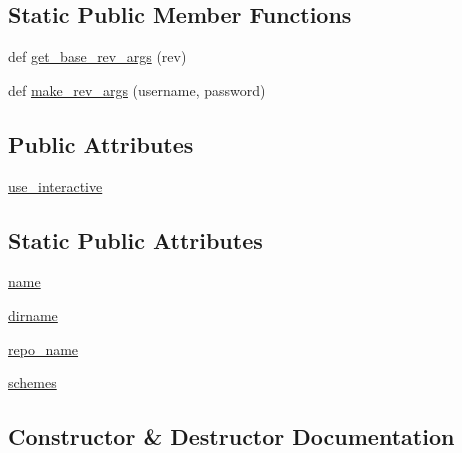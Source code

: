 \subsection*{Static Public Member Functions}
\begin{DoxyCompactItemize}
\item 
def \hyperlink{classpip_1_1__internal_1_1vcs_1_1subversion_1_1Subversion_a1464e5eebd133c448eebe026735b7215}{get\+\_\+base\+\_\+rev\+\_\+args} (rev)
\item 
def \hyperlink{classpip_1_1__internal_1_1vcs_1_1subversion_1_1Subversion_a149c6103598584b66d727d72d6a34992}{make\+\_\+rev\+\_\+args} (username, password)
\end{DoxyCompactItemize}
\subsection*{Public Attributes}
\begin{DoxyCompactItemize}
\item 
\hyperlink{classpip_1_1__internal_1_1vcs_1_1subversion_1_1Subversion_a6d2f25fce53da7b67e8214fabaacfb02}{use\+\_\+interactive}
\end{DoxyCompactItemize}
\subsection*{Static Public Attributes}
\begin{DoxyCompactItemize}
\item 
\hyperlink{classpip_1_1__internal_1_1vcs_1_1subversion_1_1Subversion_a91f38ef2ac2532faf91866a31e67a782}{name}
\item 
\hyperlink{classpip_1_1__internal_1_1vcs_1_1subversion_1_1Subversion_a713791faec9830de44a58b931e10cda1}{dirname}
\item 
\hyperlink{classpip_1_1__internal_1_1vcs_1_1subversion_1_1Subversion_a15a36a074aee7bf3b8bdeb3be1a655ea}{repo\+\_\+name}
\item 
\hyperlink{classpip_1_1__internal_1_1vcs_1_1subversion_1_1Subversion_a0eb08ac013bb1cc57f0eeebfaf99ec02}{schemes}
\end{DoxyCompactItemize}


\subsection{Constructor \& Destructor Documentation}
\mbox{\label{classpip_1_1__internal_1_1vcs_1_1subversion_1_1Subversion_abc67960376600c626c554f413d1634cf}} 
